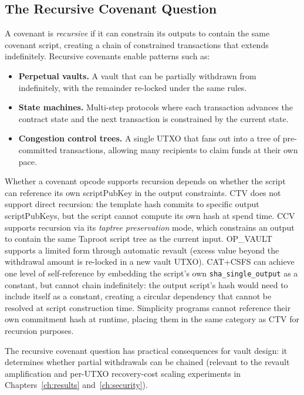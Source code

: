 \subsection{The Recursive Covenant Question} \label{ss:recursive}

A covenant is \emph{recursive} if it can constrain its outputs to contain the same
covenant script, creating a chain of constrained transactions that extends indefinitely.
Recursive covenants enable patterns such as:

\begin{itemize}
\item \textbf{Perpetual vaults.} A vault that can be partially withdrawn from
  indefinitely, with the remainder re-locked under the same rules.
\item \textbf{State machines.} Multi-step protocols where each transaction advances the
  contract state and the next transaction is constrained by the current state.
\item \textbf{Congestion control trees.} A single UTXO that fans out into a tree of
  pre-committed transactions, allowing many recipients to claim funds at their own pace.
\end{itemize}

Whether a covenant opcode supports recursion depends on whether the script can reference
its own scriptPubKey in the output constraints. CTV does not support direct recursion:
the template hash commits to specific output scriptPubKeys, but the script cannot
compute its own hash at spend time. CCV supports recursion via its \emph{taptree
preservation} mode, which constrains an output to contain the same Taproot script
tree as the current input. OP\_VAULT supports a limited form through automatic revault
(excess value beyond the withdrawal amount is re-locked in a new vault UTXO).
CAT+CSFS can achieve one level of self-reference by embedding the script's own
\texttt{sha\_single\_output} as a constant, but cannot chain indefinitely: the
output script's hash would need to include itself as a constant, creating a
circular dependency that cannot be resolved at script construction
time. Simplicity
programs cannot reference their own commitment hash at runtime, placing them in the
same category as CTV for recursion purposes.

The recursive covenant question has practical consequences for vault design: it determines
whether partial withdrawals can be chained (relevant to the revault amplification and
per-UTXO recovery-cost scaling experiments in Chapters~\ref{ch:results} and~\ref{ch:security}).

